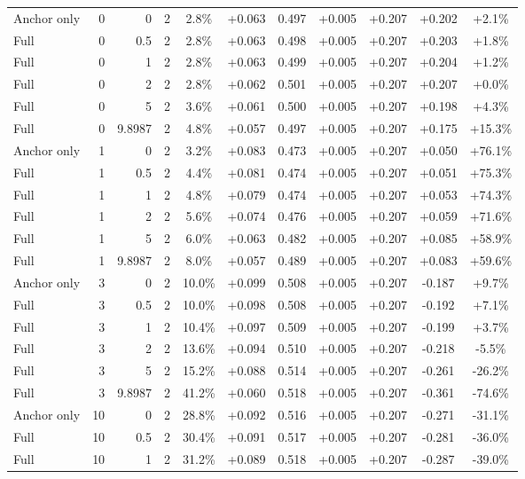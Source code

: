 \begin{table}[htbp]
\begin{tabular}{lrrrccccccc}
Anchor only & 0 & 0 & 2 & 2.8\% & +0.063 & 0.497 & +0.005 & +0.207 & +0.202 & +2.1\% \\
Full & 0 & 0.5 & 2 & 2.8\% & +0.063 & 0.498 & +0.005 & +0.207 & +0.203 & +1.8\% \\
Full & 0 & 1 & 2 & 2.8\% & +0.063 & 0.499 & +0.005 & +0.207 & +0.204 & +1.2\% \\
Full & 0 & 2 & 2 & 2.8\% & +0.062 & 0.501 & +0.005 & +0.207 & +0.207 & +0.0\% \\
Full & 0 & 5 & 2 & 3.6\% & +0.061 & 0.500 & +0.005 & +0.207 & +0.198 & +4.3\% \\
Full & 0 & 9.8987 & 2 & 4.8\% & +0.057 & 0.497 & +0.005 & +0.207 & +0.175 & +15.3\% \\
Anchor only & 1 & 0 & 2 & 3.2\% & +0.083 & 0.473 & +0.005 & +0.207 & +0.050 & +76.1\% \\
Full & 1 & 0.5 & 2 & 4.4\% & +0.081 & 0.474 & +0.005 & +0.207 & +0.051 & +75.3\% \\
Full & 1 & 1 & 2 & 4.8\% & +0.079 & 0.474 & +0.005 & +0.207 & +0.053 & +74.3\% \\
Full & 1 & 2 & 2 & 5.6\% & +0.074 & 0.476 & +0.005 & +0.207 & +0.059 & +71.6\% \\
Full & 1 & 5 & 2 & 6.0\% & +0.063 & 0.482 & +0.005 & +0.207 & +0.085 & +58.9\% \\
Full & 1 & 9.8987 & 2 & 8.0\% & +0.057 & 0.489 & +0.005 & +0.207 & +0.083 & +59.6\% \\
Anchor only & 3 & 0 & 2 & 10.0\% & +0.099 & 0.508 & +0.005 & +0.207 & -0.187 & +9.7\% \\
Full & 3 & 0.5 & 2 & 10.0\% & +0.098 & 0.508 & +0.005 & +0.207 & -0.192 & +7.1\% \\
Full & 3 & 1 & 2 & 10.4\% & +0.097 & 0.509 & +0.005 & +0.207 & -0.199 & +3.7\% \\
Full & 3 & 2 & 2 & 13.6\% & +0.094 & 0.510 & +0.005 & +0.207 & -0.218 & -5.5\% \\
Full & 3 & 5 & 2 & 15.2\% & +0.088 & 0.514 & +0.005 & +0.207 & -0.261 & -26.2\% \\
Full & 3 & 9.8987 & 2 & 41.2\% & +0.060 & 0.518 & +0.005 & +0.207 & -0.361 & -74.6\% \\
Anchor only & 10 & 0 & 2 & 28.8\% & +0.092 & 0.516 & +0.005 & +0.207 & -0.271 & -31.1\% \\
Full & 10 & 0.5 & 2 & 30.4\% & +0.091 & 0.517 & +0.005 & +0.207 & -0.281 & -36.0\% \\
Full & 10 & 1 & 2 & 31.2\% & +0.089 & 0.518 & +0.005 & +0.207 & -0.287 & -39.0\% \\

\end{tabular}
\end{table}
